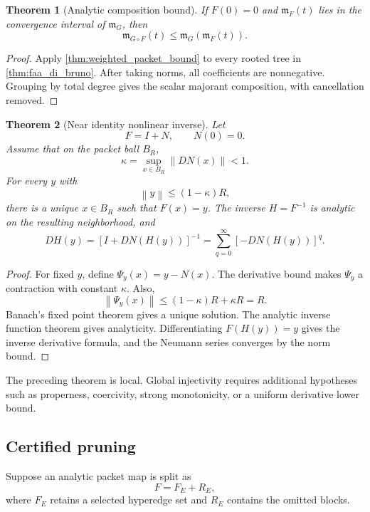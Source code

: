 \documentclass{aomart}
\newtheorem{theorem}{Theorem}[section]
\theoremstyle{definition}
\theoremstyle{remark}
\newcommand{\norm}[1]{\left\lVert#1\right\rVert}
\begin{document}
\begin{theorem}[Analytic composition bound]\label{thm:analytic_composition}
If \(F(0)=0\) and \(\mathfrak m_F(t)\) lies in the convergence interval of \(\mathfrak m_G\), then
\[
 \boxed{
 \mathfrak m_{G\circ F}(t)
 \le
 \mathfrak m_G(\mathfrak m_F(t)).
 }
\]
\end{theorem}

\begin{proof}
Apply \cref{thm:weighted_packet_bound} to every rooted tree in \cref{thm:faa_di_bruno}. After taking norms, all coefficients are nonnegative. Grouping by total degree gives the scalar majorant composition, with cancellation removed.
\end{proof}

\begin{theorem}[Near identity nonlinear inverse]\label{thm:near_identity_inverse}
Let
\[
 F=I+N,
 \qquad
 N(0)=0.
\]
Assume that on the packet ball \(B_R\),
\[
 \kappa
 =
 \sup_{x\in B_R}\norm{DN(x)}<1.
\]
For every \(y\) with
\[
 \norm{y}\le(1-\kappa)R,
\]
there is a unique \(x\in B_R\) such that \(F(x)=y\). The inverse \(H=F^{-1}\) is analytic on the resulting neighborhood, and
\[
 DH(y)
 =
 [I+DN(H(y))]^{-1}
 =
 \sum_{q=0}^{\infty}[-DN(H(y))]^q.
\]
\end{theorem}

\begin{proof}
For fixed \(y\), define \(\Psi_y(x)=y-N(x)\). The derivative bound makes \(\Psi_y\) a contraction with constant \(\kappa\). Also,
\[
 \norm{\Psi_y(x)}
 \le
 (1-\kappa)R+\kappa R
 =R.
\]
Banach's fixed point theorem gives a unique solution. The analytic inverse function theorem gives analyticity. Differentiating \(F(H(y))=y\) gives the inverse derivative formula, and the Neumann series converges by the norm bound.
\end{proof}

\begin{remark}\label{rem:global_inverse_boundary}
The preceding theorem is local. Global injectivity requires additional hypotheses such as properness, coercivity, strong monotonicity, or a uniform derivative lower bound.
\end{remark}

\subsection{Certified pruning}

Suppose an analytic packet map is split as
\[
 F=F_E+R_E,
\]
where \(F_E\) retains a selected hyperedge set and \(R_E\) contains the omitted blocks.
\end{document}
